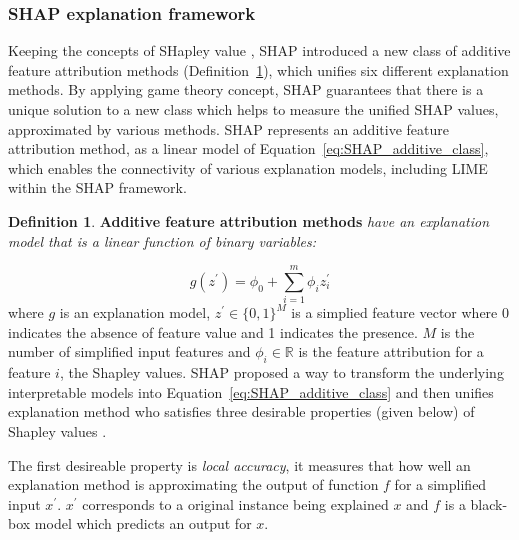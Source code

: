 \documentclass[english]{tktltiki2}
\theoremstyle{definition}
\newtheorem{definition}[thm]{Definition}
\theoremstyle{remark}
\begin{document}
\subsubsection{SHAP explanation framework} %
Keeping the concepts of SHapley value \citep{shapley1953value}, SHAP \citep{lundberg2017unified} introduced a new class of additive feature attribution methods (Definition~\ref{def:SHAP_additive_class}), which unifies six different explanation methods. By applying game theory concept, SHAP guarantees that there is a unique solution to a new class which helps to measure the unified SHAP values, approximated by various methods. SHAP represents an additive feature attribution method, as a linear model of Equation~\eqref{eq:SHAP_additive_class}, which enables the connectivity of various explanation models, including LIME \citep{ribeiro2016should} within the SHAP framework.

\begin{definition}\label{def:SHAP_additive_class}{\textbf{Additive feature attribution methods} \textit{have an explanation model that is a linear
function of binary variables:}}
\end{definition}

\begin{equation}\label{eq:SHAP_additive_class}
	g(z^\prime) =  \phi_0 + \sum_{i=1}^{m} \phi_i z_i^\prime 
\end{equation}
where $g$ is an explanation model, $z^\prime \in \{0,1\}^{M}$ is a simplied feature vector where 0 indicates the absence of feature value and 1 indicates the presence. $M$ is the number of simplified input features and $\phi_i \in \mathbb{R}$ is the feature attribution for a feature $i$, the Shapley values. SHAP proposed a way to transform the underlying interpretable models into Equation~\eqref{eq:SHAP_additive_class} and then unifies explanation method who satisfies three desirable properties (given below) of Shapley values \citep{molnarinterpretable}.

The first desireable property is \textit{local accuracy}, it measures that how well an explanation method is approximating the output of function $f$ for a simplified input $x^\prime$. $x^\prime$ corresponds to a original instance being explained $x$ and $f$ is a black-box model which predicts an output for $x$.
\end{document}
